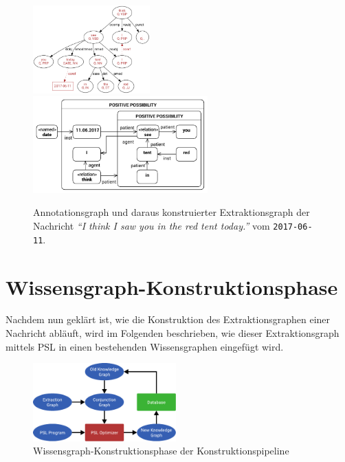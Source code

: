 \begin{figure}[h]
	\includegraphics[width=0.4\textwidth]{gfx/text2kg/annotationGraph1.pdf}
	\includegraphics[width=0.6\textwidth]{gfx/text2kg/extractionGraph1.pdf}
	\caption{Annotationsgraph und daraus konstruierter Extraktionsgraph der Nachricht \textit{``I think I saw you in the red tent today.''} vom \texttt{2017-06-11}.}\label{fig:text2kg:extractionGraph1} %
\end{figure}

\section{Wissensgraph-Konstruktionsphase}%
\label{sec:text2kg:psl}

Nachdem nun geklärt ist, wie die Konstruktion des Extraktionsgraphen einer Nachricht abläuft, wird im Folgenden beschrieben, wie dieser Extraktionsgraph mittels PSL in einen bestehenden Wissensgraphen eingefügt wird.

\begin{figure}[h]
	\centering
	\includegraphics[width=0.49\textwidth]{gfx/text2kg/pslPhase.pdf}
	\caption{Wissensgraph-Konstruktionsphase der Konstruktionspipeline}\label{fig:text2kg:pslPhase}
\end{figure}

